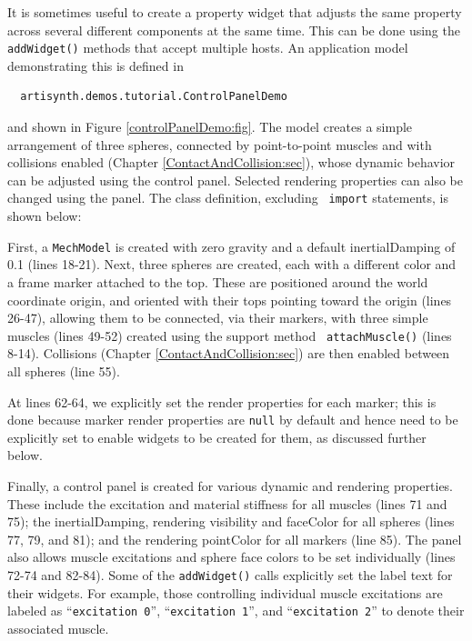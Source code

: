 It is sometimes useful to create a property widget that adjusts the
same property across several different components at the same time.
This can be done using the {\tt addWidget()} methods that accept
multiple hosts. An application model demonstrating this is defined in
%
\begin{verbatim}
  artisynth.demos.tutorial.ControlPanelDemo
\end{verbatim}
%
and shown in Figure \ref{controlPanelDemo:fig}.  The model creates a
simple arrangement of three spheres, connected by point-to-point
muscles and with collisions enabled
(Chapter \ref{ContactAndCollision:sec}), whose dynamic behavior can be
adjusted using the control panel. Selected rendering properties can
also be changed using the panel.  The class definition, excluding {\tt
import} statements, is shown below:
%
\lstset{numbers=left} 
\iflatexml

\else

\fi
\lstset{numbers=none}
%
First, a {\tt MechModel} is created with zero gravity and a default
{\sf inertialDamping} of 0.1 (lines 18-21). Next, three spheres are
created, each with a different color and a frame marker attached to
the top. These are positioned around the world coordinate origin, and
oriented with their tops pointing toward the origin (lines 26-47),
allowing them to be connected, via their markers, with three simple
muscles (lines 49-52) created using the support method {\tt
attachMuscle()} (lines 8-14). Collisions
(Chapter \ref{ContactAndCollision:sec}) are then enabled between all
spheres (line 55).

At lines 62-64, we explicitly set the render properties for each
marker; this is done because marker render properties are {\tt null}
by default and hence need to be explicitly set to enable widgets to be
created for them, as discussed further below.

Finally, a control panel is created for various dynamic and rendering
properties. These include the {\sf excitation} and material {\sf
stiffness} for all muscles (lines 71 and 75); the {\sf
inertialDamping}, rendering {\sf visibility} and {\sf faceColor} for
all spheres (lines 77, 79, and 81); and the rendering {\sf pointColor}
for all markers (line 85). The panel also allows muscle excitations
and sphere face colors to be set individually (lines 72-74 and 82-84).
Some of the {\tt addWidget()} calls explicitly set the label text for
their widgets. For example, those controlling individual muscle
excitations are labeled as ``{\tt excitation 0}'', ``{\tt excitation
1}'', and ``{\tt excitation 2}'' to denote their associated muscle.

